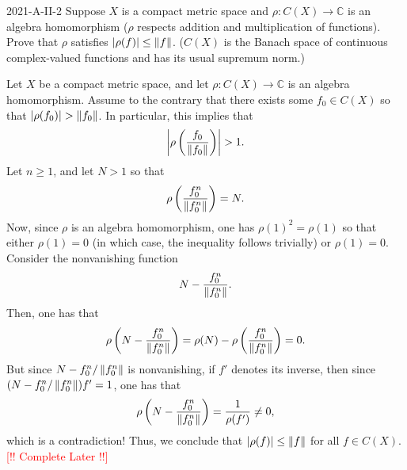 \documentclass{article}
\newcommand{\complete}{\textcolor{red}{[!! Complete Later !!]}}
\begin{document}
	\begin{prb}{2021-A-II-2}
		Suppose $X$ is a compact metric space and $\rho: C(X) \to \mathbb{C}$ is an algebra homomorphism ($\rho$ respects addition and multiplication of functions). Prove that $\rho$ satisfies $|\rho(f)|\leq \left\Vert f \right\Vert$. ($C(X)$ is the Banach space of continuous complex-valued functions and has its usual supremum norm.)
	\end{prb}
	Let $X$ be a compact metric space, and let $\rho: C(X) \to \mathbb{C}$ is an algebra homomorphism. Assume to the contrary that there exists some $f_{0} \in C(X)$ so that $|\rho(f_{0})| > \left\Vert f_{0} \right\Vert$. In particular, this implies that 
	\begin{equation*}
		\left| \rho\left(\frac{f_{0}}{\left\Vert f_{0} \right\Vert}\right) \right| > 1. 
	\end{equation*}
	Let $n \geq 1$, and let $N > 1$ so that 
	\begin{equation*}
		\rho\left(\frac{f_{0}^{n}}{\left\Vert f_{0}^{n} \right\Vert}\right) = N. 
	\end{equation*}
	Now, since $\rho$ is an algebra homomorphism, one has $\rho(1)^{2} = \rho(1)$ so that either $\rho(1) = 0$ (in which case, the inequality follows trivially) or $\rho(1) = 0$. Consider the nonvanishing function 
	\begin{equation*}
		N - \frac{f_{0}^{n}}{\left\Vert f_{0}^{n} \right\Vert}. 
	\end{equation*}
	Then, one has that 
	\begin{equation*}
		\rho\left(N - \frac{f_{0}^{n}}{\left\Vert f_{0}^{n} \right\Vert}\right) = \rho(N) - \rho\left(\frac{f_{0}^{n}}{\left\Vert f_{0}^{n} \right\Vert}\right) =0. 
	\end{equation*}
	But since $N - f_{0}^{n}/\left\Vert f_{0}^{n} \right\Vert$ is nonvanishing, if $f'$ denotes its inverse, then since $(N - f_{0}^{n}/\left\Vert f_{0}^{n} \right\Vert)f' = 1$, one has that 
	\begin{equation*}
		\rho\left(N - \frac{f_{0}^{n}}{\left\Vert f_{0}^{n} \right\Vert}\right) = \frac{1}{\rho(f')} \neq 0, 
	\end{equation*}
	which is a contradiction! Thus, we conclude that $|\rho(f)| \leq \left\Vert f \right\Vert$ for all $f \in C(X)$. \complete 
	
\end{document}

